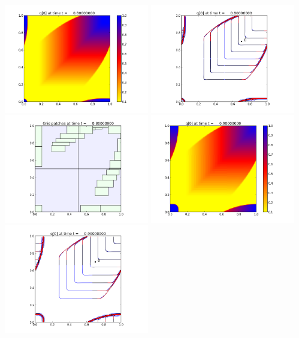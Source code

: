 \documentclass[11pt]{article}
\begin{document}
\vskip 10pt 
\includegraphics[width=0.475\textwidth]{frame0008fig0.png}
\includegraphics[width=0.475\textwidth]{frame0008fig1.png}
\vskip 10pt 
\includegraphics[width=0.475\textwidth]{frame0008fig2.png}
\vskip 10pt 
\includegraphics[width=0.475\textwidth]{frame0009fig0.png}
\includegraphics[width=0.475\textwidth]{frame0009fig1.png}
\end{document}
